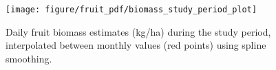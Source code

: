 \documentclass{article}\usepackage[]{graphicx}\usepackage[]{color}
\newenvironment{knitrout}{}{} %
\begin{document}
\begin{figure}
\begin{knitrout}
\color{fgcolor}

{\centering \texttt{[image: figure/fruit\_pdf/biomass\_study\_period\_plot]} 

}



\end{knitrout}

\caption{Daily fruit biomass estimates (kg/ha) during the study period, interpolated between monthly values (red points) using spline smoothing.}
\end{figure}

\clearpage
\printbibliography
\end{document}
